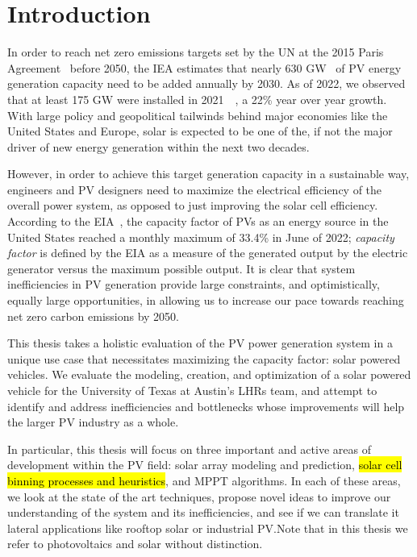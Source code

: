 \chapter*{Introduction}

In order to reach net zero emissions targets set by the \ac{UN} at the
2015 Paris Agreement~\cite{UN_Paris_agreement} before 2050, the \ac{IEA}
estimates that nearly 630 \ac{GW}~\cite{IEA_roadmap} of \ac{PV} energy
generation capacity need to be added annually by 2030. As of 2022, we observed
that at least 175 GW were installed in 2021~\cite{IEA_trends}~\cite{IEA_snapshot}, a 22\% year over year growth. With large policy and
geopolitical tailwinds behind major economies like the United States and Europe,
solar is expected to be one of the, if not the major driver of new energy
generation within the next two decades.

However, in order to achieve this target generation capacity in a sustainable
way, engineers and \ac{PV} designers need to maximize the electrical
efficiency of the overall power system, as opposed to just improving the solar
cell efficiency. According to the \ac{EIA}~\cite{EIA_capacity}, the capacity
factor of \ac{PV}s as an energy source in the United States reached a
monthly maximum of 33.4\% in June of 2022; \textit{capacity factor} is defined
by the \ac{EIA} as a measure of the generated output by the electric generator
versus the maximum possible output. It is clear that system inefficiencies in
\ac{PV} generation provide large constraints, and optimistically, equally
large opportunities, in allowing us to increase our pace towards reaching net
zero carbon emissions by 2050.

This thesis takes a holistic evaluation of the \ac{PV} power generation
system in a unique use case that necessitates maximizing the capacity factor:
solar powered vehicles. We evaluate the modeling, creation, and optimization of
a solar powered vehicle for the University of Texas at Austin's \ac{LHRs} team,
and attempt to identify and address inefficiencies and bottlenecks whose
improvements will help the larger \ac{PV} industry as a whole.

In particular, this thesis will focus on three important and active areas of
development within the \ac{PV} field: solar array modeling and prediction,
\hl{solar cell binning processes and heuristics},
and \ac{MPPT} algorithms.
In each of these areas, we look at the state of the art techniques, propose novel
ideas to improve our understanding of the system and its inefficiencies, and see
if we can translate it lateral applications like rooftop solar or industrial
\ac{PV}.\@ Note that in this thesis we refer to photovoltaics and solar without
distinction.

